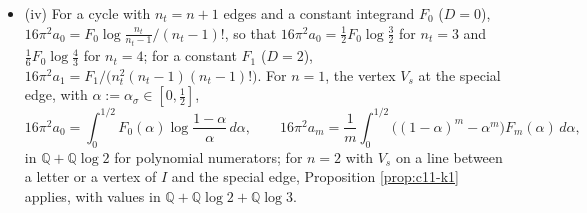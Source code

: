 \begin{theorem}
\begin{itemize}
\item (iv) For a cycle with $n_t=n+1$ edges and a constant integrand $F_0$ ($D=0$), $16\pi^2a_0=F_0\log\frac{n_t}{n_t-1}\big/(n_t-1)!$, so that $16\pi^2a_0=\tfrac12F_0\log\tfrac32$ for $n_t=3$ and $\tfrac16F_0\log\tfrac43$ for $n_t=4$; for a constant $F_1$ ($D=2$), $16\pi^2a_1=F_1\big/\big(n_t^2(n_t-1)(n_t-1)!\big)$. For $n=1$, the vertex $V_s$ at the special edge, with $\alpha:=\alpha_\sigma\in[0,\tfrac12]$,
\[
16\pi^2a_0=\int_0^{1/2}F_0(\alpha)\log\frac{1-\alpha}\alpha\,d\alpha,\qquad 16\pi^2a_m=\frac1m\int_0^{1/2}\big((1-\alpha)^m-\alpha^m\big)F_m(\alpha)\,d\alpha,
\]
in $\mathbb Q+\mathbb Q\log2$ for polynomial numerators; for $n=2$ with $V_s$ on a line between a letter or a vertex of $I$ and the special edge, Proposition \ref{prop:c11-k1} applies, with values in $\mathbb Q+\mathbb Q\log2+\mathbb Q\log3$.
\end{itemize}
\end{theorem}

